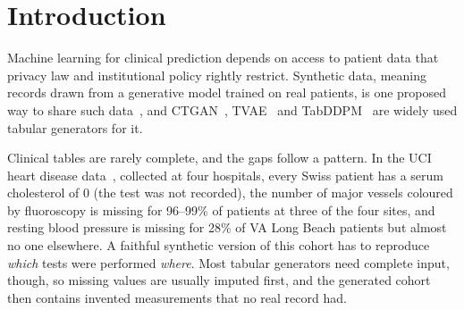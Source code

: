 \documentclass[runningheads]{llncs}
\begin{document}
\section{Introduction}

Machine learning for clinical prediction depends on access to patient data
that privacy law and institutional policy rightly restrict. Synthetic data,
meaning records drawn from a generative model trained on real patients, is
one proposed way to share such data~\cite{goncalves2020synthetic,yan2022benchmark},
and CTGAN~\cite{xu2019ctgan}, TVAE~\cite{xu2019ctgan} and
TabDDPM~\cite{kotelnikov2023tabddpm} are widely used tabular generators
for it.

Clinical tables are rarely complete, and the gaps follow a pattern. In the UCI heart disease data~\cite{janosi1989heart}, collected at
four hospitals, every Swiss patient has a serum
cholesterol of 0 (the test was not recorded), the number of major vessels
coloured by fluoroscopy is missing for 96--99\% of patients at three of the
four sites, and resting blood pressure is missing for 28\% of VA Long Beach
patients but almost no one elsewhere. A faithful synthetic version of this
cohort has to reproduce \emph{which} tests were performed \emph{where}.
Most tabular generators need complete input, though, so missing values are
usually imputed first, and the generated cohort then contains invented
measurements that no real record had.
\end{document}
